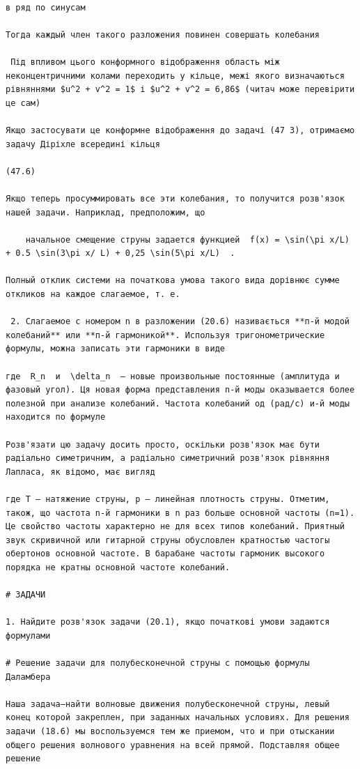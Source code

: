 \documentclass[
  ukrainian,
]{article}
\begin{document}
\begin{verbatim}

в ряд по синусам

Тогда каждый член такого разложения повинен совершать колебания

 Під впливом цього конформного відображення область між неконцентричними колами переходить у кільце, межі якого визначаються рівняннями $u^2 + v^2 = 1$ і $u^2 + v^2 = 6,86$ (читач може перевірити це сам)

Якщо застосувати це конформне відображення до задачі (47 3), отримаємо задачу Діріхле всередині кільця

(47.6)

Якщо теперь просуммировать все эти колебания, то получится розв'язок нашей задачи. Наприклад, предположим, що

    начальное смещение струны задается функцией  f(x) = \sin(\pi x/L) + 0.5 \sin(3\pi x/ L) + 0,25 \sin(5\pi x/L)  .

Полный отклик системи на початкова умова такого вида дорівнює сумме откликов на каждое слагаемое, т. е.

 2. Слагаемое с номером n в разложении (20.6) називається **п-й модой колебаний** или **п-й гармоникой**. Используя тригонометрические формулы, можна записать эти гармоники в виде

где  R_n  и  \delta_n  — новые произвольные постоянные (амплитуда и фазовый угол). Ця новая форма представления n-й моды оказывается более полезной при анализе колебаний. Частота колебаний од (рад/с) и-й моды находится по формуле

Розв'язати цю задачу досить просто, оскільки розв'язок має бути радіально симетричним, а радіально симетричний розв'язок рівняння Лапласа, як відомо, має вигляд

где Т — натяжение струны, р — линейная плотность струны. Отметим, також, що частота n-й гармоники в n раз больше основной частоты (n=1). Це свойство частоты характерно не для всех типов колебаний. Приятный звук скривичной или гитарной струны обусловлен кратностью частогы обертонов основной частоте. В барабане частоты гармоник высокого порядка не кратны основной частоте колебаний.

# ЗАДАЧИ

1. Найдите розв'язок задачи (20.1), якщо початкові умови задаются формулами

# Решение задачи для полубесконечной струны с помощью формулы Даламбера

Наша задача—найти волновые движения полубесконечной струны, левый конец которой закреплен, при заданных начальных условиях. Для решения задачи (18.6) мы воспользуемся тем же приемом, что и при отыскании общего решения волнового уравнения на всей прямой. Подставляя общее решение


\end{verbatim}
\end{document}
